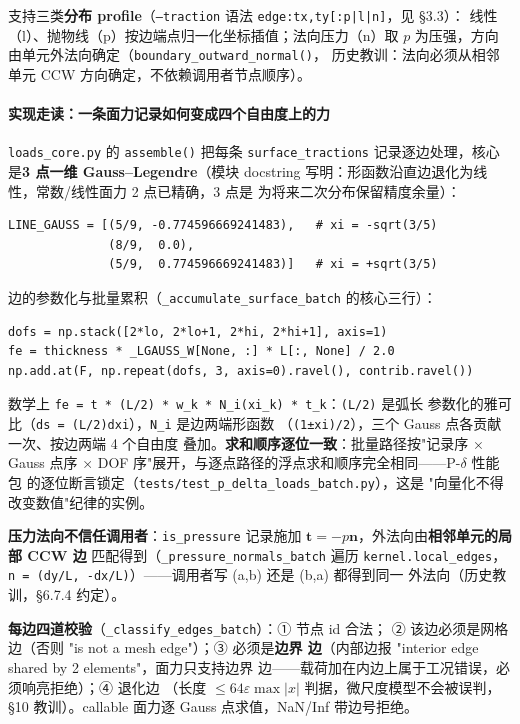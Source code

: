 \documentclass[12pt,a4paper]{ctexart}
\newcommand{\fem}{\Verb}
\begin{document}
支持三类\textbf{分布 profile}（\texttt{--traction} 语法
\texttt{edge:tx,ty[:p|l|n]}，见 §3.3）：
线性（l）、抛物线（p）按边端点归一化坐标插值；法向压力（n）取
$p$ 为压强，方向由单元外法向确定（\texttt{boundary\_outward\_normal()}，
历史教训：法向必须从相邻单元 CCW 方向确定，不依赖调用者节点顺序）。

\paragraph{实现走读：一条面力记录如何变成四个自由度上的力}

\texttt{loads\_core.py} 的 \fem|assemble()| 把每条 \fem|surface_tractions|
记录逐边处理，核心是\textbf{3 点一维 Gauss--Legendre}（模块 docstring
写明：形函数沿直边退化为线性，常数/线性面力 2 点已精确，3 点是
为将来二次分布保留精度余量）：

\begin{lstlisting}
LINE_GAUSS = [(5/9, -0.774596669241483),   # xi = -sqrt(3/5)
              (8/9,  0.0),
              (5/9,  0.774596669241483)]   # xi = +sqrt(3/5)
\end{lstlisting}

边的参数化与批量累积（\fem|_accumulate_surface_batch| 的核心三行）：

\begin{lstlisting}
dofs = np.stack([2*lo, 2*lo+1, 2*hi, 2*hi+1], axis=1)
fe = thickness * _LGAUSS_W[None, :] * L[:, None] / 2.0
np.add.at(F, np.repeat(dofs, 3, axis=0).ravel(), contrib.ravel())
\end{lstlisting}

数学上 \fem|fe = t * (L/2) * w_k * N_i(xi_k) * t_k|：\fem|(L/2)| 是弧长
参数化的雅可比（\fem|ds = (L/2)dxi|），\fem|N_i| 是边两端形函数
（\fem|(1±xi)/2|），三个 Gauss 点各贡献一次、按边两端 4 个自由度
叠加。\textbf{求和顺序逐位一致}：批量路径按"记录序 × Gauss 点序 ×
DOF 序"展开，与逐点路径的浮点求和顺序完全相同——P-$\delta$ 性能包
的逐位断言锁定（\fem|tests/test_p_delta_loads_batch.py|），这是
"向量化不得改变数值"纪律的实例。

\textbf{压力法向不信任调用者}：\fem|is_pressure| 记录施加
$\mathbf{t} = -p\mathbf{n}$，外法向由\textbf{相邻单元的局部 CCW 边}
匹配得到（\fem|_pressure_normals_batch| 遍历 \fem|kernel.local_edges|，
\fem|n = (dy/L, -dx/L)|）——调用者写 (a,b) 还是 (b,a) 都得到同一
外法向（历史教训，§6.7.4 约定）。

\textbf{每边四道校验}（\fem|_classify_edges_batch|）：① 节点 id 合法；
② 该边必须是网格边（否则 "is not a mesh edge"）；③ 必须是\textbf{边界
边}（内部边报 "interior edge shared by 2 elements"，面力只支持边界
边——载荷加在内边上属于工况错误，必须响亮拒绝）；④ 退化边
（长度 $\le 64\varepsilon\max|x|$ 判据，微尺度模型不会被误判，§10
教训）。callable 面力逐 Gauss 点求值，NaN/Inf 带边号拒绝。
\end{document}
